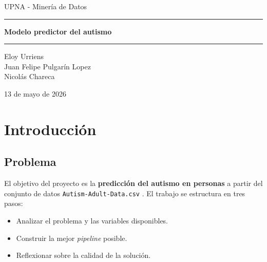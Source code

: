 \documentclass[12pt]{article}
\begin{document}
\begin{titlepage}
\centering
\vspace*{2cm}
{\Large UPNA - Minería de Datos\par}
\vspace{0.6cm}
\rule{0.8\textwidth}{0.6pt}\par
\vspace{0.6cm}
{\LARGE\bfseries Modelo predictor del autismo\par}
\vspace{0.6cm}
\rule{0.8\textwidth}{0.6pt}\par
\vspace{0.6cm}
{\large Eloy Urriens\\Juan Felipe Pulgarín Lopez\\Nicolás Chareca\par}
\vspace{0.6cm}
{\large 13 de mayo de 2026\par}
\vspace*{1.5cm}
\begin{abstract}
Este informe documenta el desarrollo de un modelo de Inteligencia Artificial, utilizando técnicas de minería de datos para la
predicción del autismo en personas usando el conjunto de datos
\texttt{Autism-Adult-Data.csv}. Se describe la limpieza y preparación mediante un
\texttt{Preparador}, el análisis exploratorio de variables y la definición de componentes
del pipeline (imputación, transformación, detección de outliers, estandarización
y modelos base). Se especifica la metodología de validación basada en
Pipeline + GridSearchCV con estratificación, y las métricas priorizadas
(F1-score y AUC de Precisión-Recall). El documento establece el marco
metodológico y el flujo de trabajo para el desarrollo y evaluación del modelo.
\end{abstract}
\end{titlepage}


\clearpage

\tableofcontents

\clearpage

\section{Introducción}
\subsection{Problema}
El objetivo del proyecto es la \textbf{predicción del autismo en personas} a partir del conjunto de datos
\texttt{Autism-Adult-Data.csv} \cite{autism_adults_kaggle,thabtah2017asd,thabtah2017review}. El trabajo se estructura en tres pasos:
\begin{itemize}
    \item Analizar el problema y las variables disponibles.
    \item Construir la mejor \emph{pipeline} posible.
    \item Reflexionar sobre la calidad de la solución.
\end{itemize}
\end{document}
